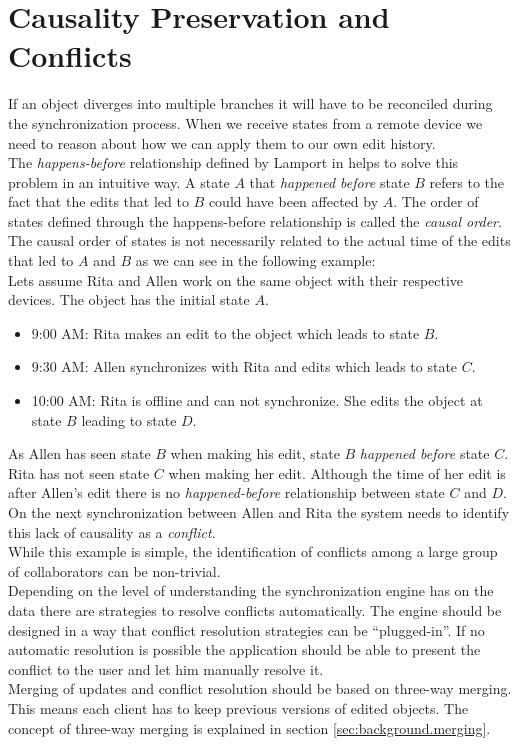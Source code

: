 \section{Causality Preservation and Conflicts}
\label{sec:requirements.causality}
If an object diverges into multiple branches it will have to be reconciled during the synchronization process.
When we receive states from a remote device we need to reason about how we can apply them to our own edit history.\\
The \emph{happens-before} relationship defined by Lamport in \cite{Lamport:1978tr} helps to solve this problem in an intuitive way.
A state $ A $ that \emph{happened before} state $B$ refers to the fact that the edits that led to $B$ could have been affected by $A$. The order of states defined through the happens-before relationship is called the \emph{causal order}.
The causal order of states is not necessarily related to the actual time of the edits that led to $A$ and $B$ as we can see in the following example:\\

Lets assume Rita and Allen work on the same object with their respective devices.
The object has the initial state $A$.

\begin{itemize}
\item 9:00 AM: Rita makes an edit to the object which leads to state $B$.
\item 9:30 AM: Allen synchronizes with Rita and edits which leads to state $C$.
\item 10:00 AM: Rita is offline and can not synchronize. She edits the object at state $B$ leading to state $D$. 
\end{itemize}

As Allen has seen state $B$ when making his edit, state $B$ \emph{happened before} state $C$.\\
Rita has not seen state $C$ when making her edit.
Although the time of her edit is after Allen's edit there is no \emph{happened-before} relationship between state $C$ and $D$.\\
On the next synchronization between Allen and Rita the system needs to identify this lack of causality as a \emph{conflict}.\\
While this example is simple, the identification of conflicts among a large group of collaborators can be non-trivial.\\
Depending on the level of understanding the synchronization engine has on the data there are strategies to resolve conflicts automatically.
The engine should be designed in a way that conflict resolution strategies can be ``plugged-in''.
If no automatic resolution is possible the application should be able to present the conflict to the user and let him manually resolve it.\\
Merging of updates and conflict resolution should be based on three-way merging.
This means each client has to keep previous versions of edited objects.
The concept of three-way merging is explained in section \ref{sec:background.merging}.

